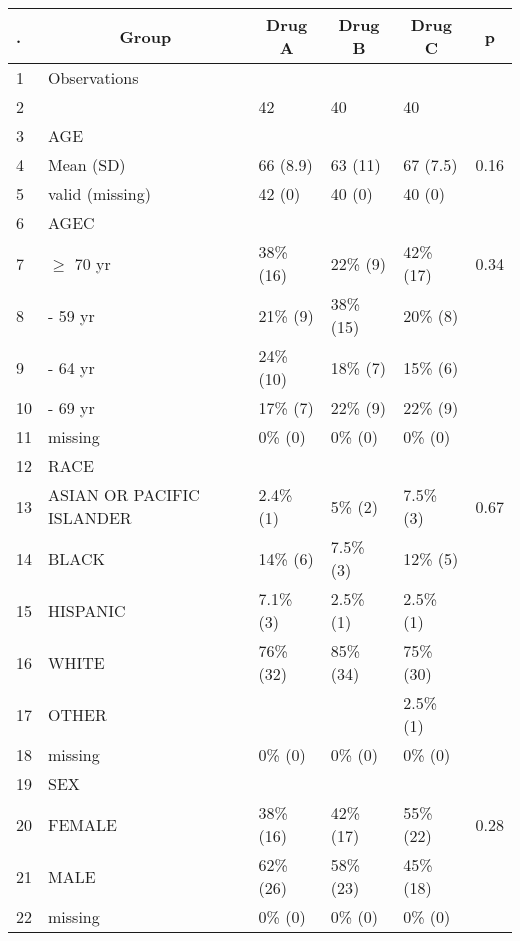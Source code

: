 \begin{table}[!tbp]
\begin{center}
\begin{tabular}{llllll}
\hline\hline
\multicolumn{1}{l}{.}&\multicolumn{1}{c}{Group}&\multicolumn{1}{c}{Drug A}&\multicolumn{1}{c}{Drug B}&\multicolumn{1}{c}{Drug C}&\multicolumn{1}{c}{p}\tabularnewline
\hline
1&Observations &&&&\tabularnewline
2&\quad \quad&42&40&40&\tabularnewline
3&AGE \quad&&&&\tabularnewline
4&\quad Mean (SD)&66 (8.9)&63 (11)&67 (7.5)&0.16\tabularnewline
5&\quad valid (missing)&42 (0)&40 (0)&40 (0)&\tabularnewline
6&AGEC &&&&\tabularnewline
7&\quad $\geq$ 70 yr&38\% (16)&22\% (9)&42\% (17)&0.34\tabularnewline
8&\quad 18 - 59 yr&21\% (9)&38\% (15)&20\% (8)&\tabularnewline
9&\quad 60 - 64 yr&24\% (10)&18\% (7)&15\% (6)&\tabularnewline
10&\quad 65 - 69 yr&17\% (7)&22\% (9)&22\% (9)&\tabularnewline
11&\quad missing&0\% (0)&0\% (0)&0\% (0)&\tabularnewline
12&RACE &&&&\tabularnewline
13&\quad ASIAN OR PACIFIC ISLANDER&2.4\% (1)&5\% (2)&7.5\% (3)&0.67\tabularnewline
14&\quad BLACK&14\% (6)&7.5\% (3)&12\% (5)&\tabularnewline
15&\quad HISPANIC&7.1\% (3)&2.5\% (1)&2.5\% (1)&\tabularnewline
16&\quad WHITE&76\% (32)&85\% (34)&75\% (30)&\tabularnewline
17&\quad OTHER&&&2.5\% (1)&\tabularnewline
18&\quad missing&0\% (0)&0\% (0)&0\% (0)&\tabularnewline
19&SEX &&&&\tabularnewline
20&\quad FEMALE&38\% (16)&42\% (17)&55\% (22)&0.28\tabularnewline
21&\quad MALE&62\% (26)&58\% (23)&45\% (18)&\tabularnewline
22&\quad missing&0\% (0)&0\% (0)&0\% (0)&\tabularnewline
\hline
\end{tabular}\end{center}
\end{table}
